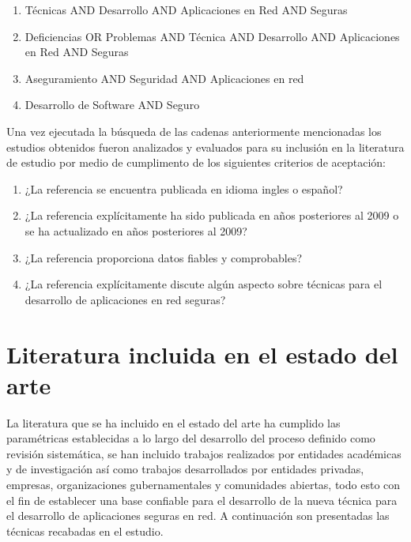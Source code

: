 \documentclass[runningheads,a4paper]{llncs}
\begin{document}
\begin{enumerate}
	\item Técnicas AND Desarrollo AND Aplicaciones en Red AND Seguras
	\item Deficiencias OR Problemas AND Técnica AND Desarrollo AND Aplicaciones en Red AND Seguras
	\item Aseguramiento AND Seguridad AND Aplicaciones en red
	\item Desarrollo de Software AND Seguro
\end{enumerate}

Una vez ejecutada la búsqueda de las cadenas anteriormente mencionadas los estudios obtenidos fueron analizados y evaluados para su inclusión en la literatura de estudio por medio de cumplimento de los siguientes criterios de aceptación:

\begin{enumerate}
	\item ¿La referencia se encuentra publicada en idioma ingles o español?
	\item ¿La referencia explícitamente ha sido publicada en años posteriores al 2009 o se ha actualizado en años posteriores al 2009?
	\item ¿La referencia proporciona datos fiables y comprobables?
	\item ¿La referencia explícitamente discute algún aspecto sobre técnicas para el desarrollo de aplicaciones en red seguras?
\end{enumerate}

\section{Literatura incluida en el estado del arte}
La literatura que se ha incluido en el estado del arte ha cumplido las paramétricas establecidas a lo largo del desarrollo del proceso definido como revisión sistemática, se han incluido trabajos realizados por entidades académicas y de investigación así como trabajos desarrollados por entidades privadas, empresas, organizaciones gubernamentales y comunidades abiertas, todo esto con el fin de establecer una base confiable para el desarrollo de la nueva técnica para el desarrollo de aplicaciones seguras en red. A continuación son presentadas las técnicas recabadas en el estudio.
 


\printnoidxglossaries     
         


\end{document}
